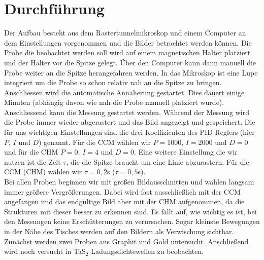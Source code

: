 \section{Durchführung}
Der Aufbau besteht aus dem Rastertunnelmikroskop und einem Computer an dem Einstellungen vorgenommen und die Bilder betrachtet werden können. Die Probe die beobachtet werden soll wird auf einem magnetischen Halter platziert und der Halter vor die Spitze gelegt. Über den Computer kann dann manuell die Probe weiter an die Spitze herangefahren werden. In das Mikroskop ist eine Lupe integriert um die Probe so schon relativ nah an die Spitze zu bringen. Anschliessen wird die automatische Annäherung gestartet. Dies dauert einige Minuten (abhängig davon wie nah die Probe manuell platziert wurde).\\
Anschliessend kann die Messung gestartet werden. Während der Messung wird die Probe immer wieder abgerastert und das Bild angezeigt und gespeichert. Die für uns wichtigen Einstellungen sind die drei Koeffizienten des PID-Reglers (hier $P$, $I$ und $D$) genannt. Für die CCM wählen wir $P=1000$, $I=2000$ und $D=0$ und für die CHM $P=0$, $I=4$ und $D=0$. Eine weitere Einstellung die wir nutzen ist die Zeit $\tau$, die die Spitze braucht um eine Linie abzurastern. Für die CCM (CHM) wählen wir $\tau=0,2$s ($\tau=0,5$s).\\
Bei allen Proben beginnen wir mit großen Bildausschnitten und wählen langsam immer größere Vergrößerungen. Dabei wird fast ausschließlich mit der CCM angefangen und das endgültige Bild aber mit der CHM aufgenommen, da die Strukturen mit dieser besser zu erkennen sind. Es fällt auf, wie wichtig es ist, bei den Messungen keine Erschütterungen zu verursachen. Sogar kleinste Bewegungen in der Nähe des Tisches werden auf den Bildern als Verwischung sichtbar.\\
Zunächst werden zwei Proben aus Graphit und Gold untersucht. Anschließend wird noch versucht in TaS$_2$  Ladungsdichtewellen zu beobachten. 
